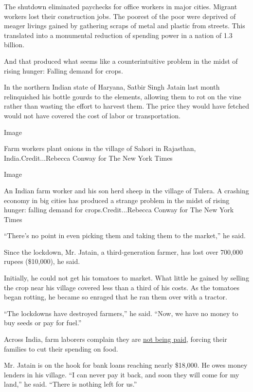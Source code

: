 The shutdown eliminated paychecks for office workers in major cities.
Migrant workers lost their construction jobs. The poorest of the poor
were deprived of meager livings gained by gathering scraps of metal and
plastic from streets. This translated into a monumental reduction of
spending power in a nation of 1.3 billion.

And that produced what seems like a counterintuitive problem in the
midst of rising hunger: Falling demand for crops.

In the northern Indian state of Haryana, Satbir Singh Jatain last month
relinquished his bottle gourds to the elements, allowing them to rot on
the vine rather than wasting the effort to harvest them. The price they
would have fetched would not have covered the cost of labor or
transportation.

Image

Farm workers plant onions in the village of Sahori in Rajasthan,
India.Credit...Rebecca Conway for The New York Times

Image

An Indian farm worker and his son herd sheep in the village of Tulera. A
crashing economy in big cities has produced a strange problem in the
midst of rising hunger: falling demand for crops.Credit...Rebecca Conway
for The New York Times

``There's no point in even picking them and taking them to the market,''
he said.

Since the lockdown, Mr. Jatain, a third-generation farmer, has lost over
700,000 rupees (\$10,000), he said.

Initially, he could not get his tomatoes to market. What little he
gained by selling the crop near his village covered less than a third of
his costs. As the tomatoes began rotting, he became so enraged that he
ran them over with a tractor.

``The lockdowns have destroyed farmers,'' he said. ``Now, we have no
money to buy seeds or pay for fuel.''

Across India, farm laborers complain they are
\href{https://www.nytimes3xbfgragh.onion/2020/09/08/world/asia/india-coronavirus-farmer-suicides-lockdown.html}{not
being paid}, forcing their families to cut their spending on food.

Mr. Jatain is on the hook for bank loans reaching nearly \$18,000. He
owes money lenders in his village. ``I can never pay it back, and soon
they will come for my land,'' he said. ``There is nothing left for us.''

